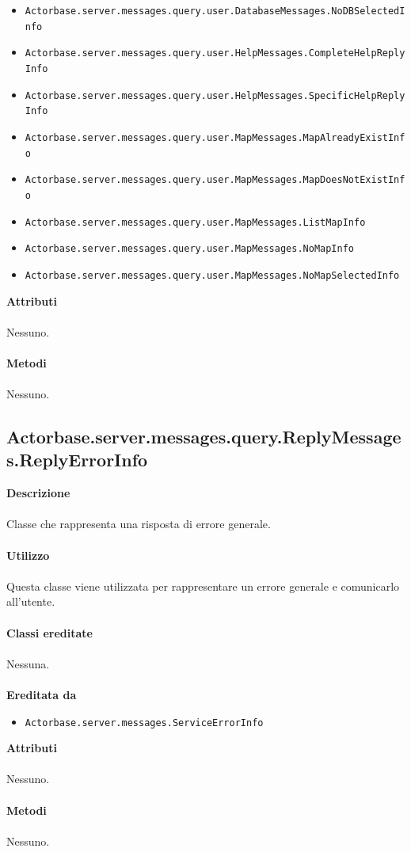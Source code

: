 \documentclass[a4paper]{article}
\begin{document}
\begin{itemize}
  				\item \texttt{Actorbase.server.messages.query.user.DatabaseMessages.NoDBSelectedInfo }
  				\item \texttt{Actorbase.server.messages.query.user.HelpMessages.CompleteHelpReplyInfo }
  				\item \texttt{Actorbase.server.messages.query.user.HelpMessages.SpecificHelpReplyInfo }
  				\item \texttt{Actorbase.server.messages.query.user.MapMessages.MapAlreadyExistInfo }
  				\item \texttt{Actorbase.server.messages.query.user.MapMessages.MapDoesNotExistInfo }
  				\item \texttt{Actorbase.server.messages.query.user.MapMessages.ListMapInfo }
  				\item \texttt{Actorbase.server.messages.query.user.MapMessages.NoMapInfo }
  				\item \texttt{Actorbase.server.messages.query.user.MapMessages.NoMapSelectedInfo }
			\end{itemize}
		\textbf{Attributi}
			\\ \\
			Nessuno.
			\\ \\
		\textbf{Metodi}
			\\ \\
			Nessuno.
		
	\subsection{Actorbase.server.messages.query.ReplyMessages.ReplyErrorInfo}
		\textbf{Descrizione}
			\\ \\
			Classe che rappresenta una risposta di errore generale.
			\\ \\
		\textbf{Utilizzo}
			\\ \\
			Questa classe viene utilizzata per rappresentare un errore generale e comunicarlo all'utente.
			\\ \\
		\textbf{Classi ereditate}
			\\ \\
			Nessuna.
			\\ \\
		\textbf{Ereditata da}
			\begin{itemize}
				\item \texttt{Actorbase.server.messages.ServiceErrorInfo }
			\end{itemize}
		\textbf{Attributi}
			\\ \\
			Nessuno.
			\\ \\
		\textbf{Metodi}
			\\ \\
			Nessuno.
					
\end{document}
